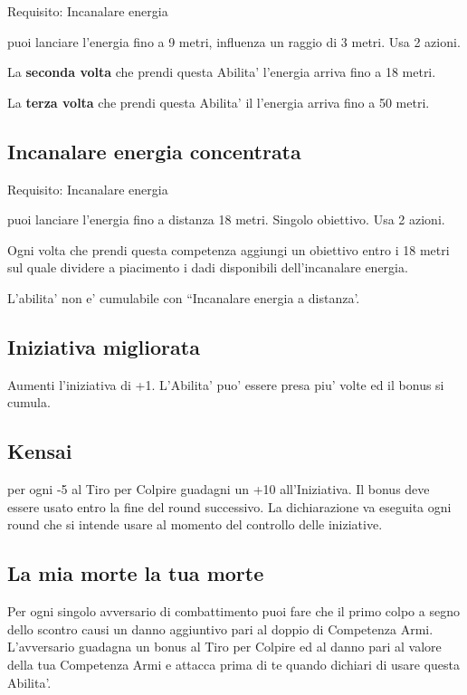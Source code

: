\documentclass[a4paper,11pt,twoside,openany]{dndbook}
\begin{document}
Requisito: Incanalare energia

puoi lanciare l'energia fino a 9 metri, influenza un raggio di 3 metri. Usa 2 azioni.

La \textbf{seconda volta} che prendi questa Abilita' l'energia arriva fino a 18 metri.

La \textbf{terza volta} che prendi questa Abilita' il l'energia arriva fino a 50 metri.

\subsection{Incanalare energia concentrata}

Requisito: Incanalare energia

puoi lanciare l'energia fino a distanza 18 metri. Singolo obiettivo. Usa 2 azioni.

Ogni volta che prendi questa competenza aggiungi un obiettivo entro i 18 metri sul quale dividere a piacimento i dadi disponibili dell'incanalare energia.

L'abilita' non e' cumulabile con ``Incanalare energia a distanza'.

\subsection{Iniziativa migliorata}

Aumenti l'iniziativa di +1. L'Abilita' puo' essere presa piu' volte ed il bonus si cumula.

\subsection{Kensai}

per ogni -5 al Tiro per Colpire guadagni un +10 all'Iniziativa. Il bonus deve essere usato entro la fine del round successivo. La dichiarazione va eseguita ogni round che si intende usare al momento del controllo delle iniziative.

\subsection{La mia morte la tua morte}

Per ogni singolo avversario di combattimento puoi fare che il primo colpo a segno dello scontro causi un danno aggiuntivo pari al doppio di Competenza Armi. L'avversario guadagna un bonus al Tiro per Colpire ed al danno pari al valore della tua Competenza Armi e attacca prima di te quando dichiari di usare questa Abilita'.
\end{document}
